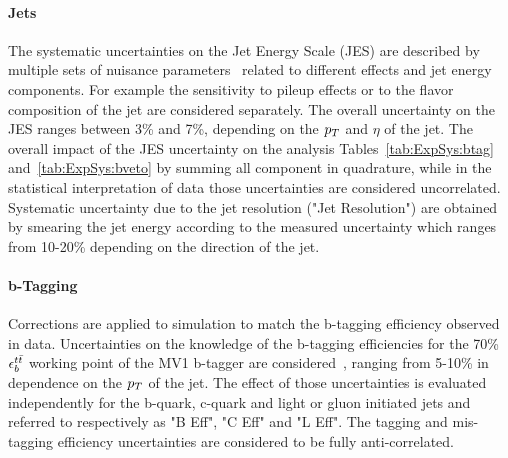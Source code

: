\paragraph{Jets}
The systematic uncertainties on the Jet Energy Scale (JES) are described by multiple sets of nuisance parameters~\cite{JES}
related to different effects and jet energy components. For example the sensitivity to pileup effects or
to the flavor composition of the jet are considered separately. The overall uncertainty on the JES ranges 
between 3\% and 7\%, depending on the $p_{T}$ and $\eta$ of the jet. 
The overall impact of the JES uncertainty on the analysis Tables~\ref{tab:ExpSys:btag} and~\ref{tab:ExpSys:bveto}
by summing all component in quadrature, while in the statistical interpretation of data
those uncertainties are considered uncorrelated.
Systematic uncertainty due to the jet resolution ("Jet Resolution") are obtained by smearing the jet energy 
according to the measured  uncertainty which ranges from 10-20\% depending on the direction of the jet.

\paragraph{b-Tagging}  Corrections are applied to simulation
to match the b-tagging efficiency observed  in data. Uncertainties on the knowledge 
of the b-tagging efficiencies for the 70\% $\epsilon_b^{t\bar{t}}$ working point of the MV1 b-tagger are
considered~\cite{BtaggingScaleFactors,BtaggingScaleFactorsNew}, ranging from 5-10\% in dependence on the $p_{T}$ of the jet. 
The effect of those uncertainties is evaluated independently for the
 b-quark, c-quark and light or gluon initiated jets and referred to respectively 
 as "B  Eff", "C Eff" and "L Eff". The tagging and mis-tagging efficiency uncertainties 
 are considered to be fully anti-correlated. 

